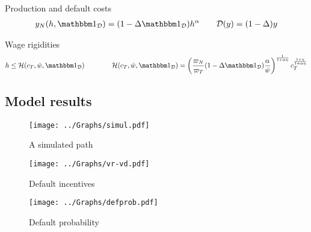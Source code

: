 Production and default costs
\begin{align}
	y_N(h, \ind_\mathcal{D}) = (1 - \Delta \ind_\mathcal{D}) h^\alpha \qquad \mathcal{D}(y) = (1-\Delta) y
\end{align}

Wage rigidities
\begin{align}
	h \leq \mathcal{H}(c_T, \bar{w}, \ind_\mathcal{D}) \qquad\qquad \mathcal{H}(c_T, \bar{w}, \ind_\mathcal{D}) = \left(\frac{\varpi_N}{\varpi_T} (1 - \Delta \ind_\mathcal{D}) \frac{\alpha}{\bar{w}}\right)^\frac{1}{1+\alpha\eta} c_T^\frac{1+\eta}{1+\alpha\eta}
\end{align}


\subsection{Model results}

\begin{figure}[!hbtp]\centering
	\texttt{[image: ../Graphs/simul.pdf]}
	\caption{A simulated path}
\end{figure}

\begin{figure}[!hbtp]\centering
	\texttt{[image: ../Graphs/vr-vd.pdf]}
	\caption{Default incentives}
\end{figure}

\begin{figure}[!hbtp]\centering
	\texttt{[image: ../Graphs/defprob.pdf]}
	\caption{Default probability}
\end{figure}

